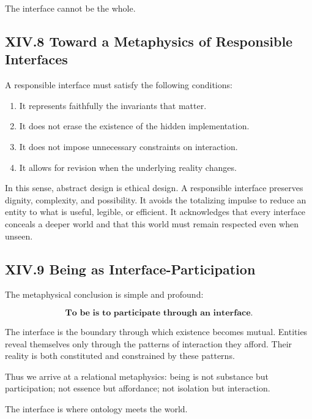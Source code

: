 \documentclass[12pt,letterpaper]{article}
\begin{document}
The interface cannot be the whole.

\subsection{XIV.8 Toward a Metaphysics of Responsible Interfaces}

A responsible interface must satisfy the following conditions:

\begin{enumerate}
    \item It represents faithfully the invariants that matter.
    \item It does not erase the existence of the hidden implementation.
    \item It does not impose unnecessary constraints on interaction.
    \item It allows for revision when the underlying reality changes.
\end{enumerate}

In this sense, abstract design is ethical design. A responsible interface preserves dignity, complexity, and possibility. It avoids the totalizing impulse to reduce an entity to what is useful, legible, or efficient. It acknowledges that every interface conceals a deeper world and that this world must remain respected even when unseen.

\subsection{XIV.9 Being as Interface-Participation}

The metaphysical conclusion is simple and profound:

\[
\textbf{To be is to participate through an interface.}
\]

The interface is the boundary through which existence becomes mutual. Entities reveal themselves only through the patterns of interaction they afford. Their reality is both constituted and constrained by these patterns.

Thus we arrive at a relational metaphysics: being is not substance but participation; not essence but affordance; not isolation but interaction.

The interface is where ontology meets the world.
\end{document}
